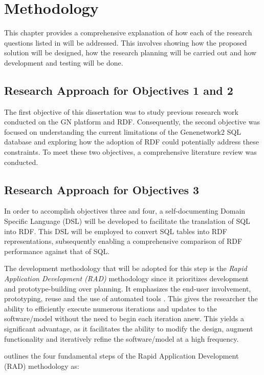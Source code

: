 \chapter{Methodology}

This chapter provides a comprehensive explanation of how each of the research questions listed in  will be addressed.  This involves showing how the proposed solution will be designed, how the research planning will be carried out and how development and testing will be done.

\section{Research Approach for Objectives 1 and 2}

The first objective of this dissertation was to study previous research work conducted on the GN platform and RDF.  Consequently, the second objective was focused on understanding the current limitations of the Genenetwork2 SQL database and exploring how the adoption of RDF could potentially address these constraints.  To meet these two objectives, a comprehensive literature review was conducted.

\section{Research Approach for Objectives 3}

In order to accomplish objectives three and four, a self-documenting Domain Specific Language (DSL) will be developed to facilitate the translation of SQL into RDF.  This DSL will be employed to convert SQL tables into RDF representations, subsequently enabling a comprehensive comparison of RDF performance against that of SQL.

The development methodology that will be adopted for this step is the \textit{Rapid Application Development (RAD)} methodology since it prioritizes development and prototype-building over planning.  It emphasizes the end-user involvement, prototyping, reuse and the use of automated tools \citep*{van2008software}.  This gives the researcher the ability to efficiently execute numerous iterations and updates to the software/model without the need to begin each iteration anew.  This yields a significant advantage, as it facilitates the ability to modify the design, augment functionality and iteratively refine the software/model at a high frequency.

\citet*{van2008software} outlines the four fundamental steps of the Rapid Application Development (RAD) methodology as:

